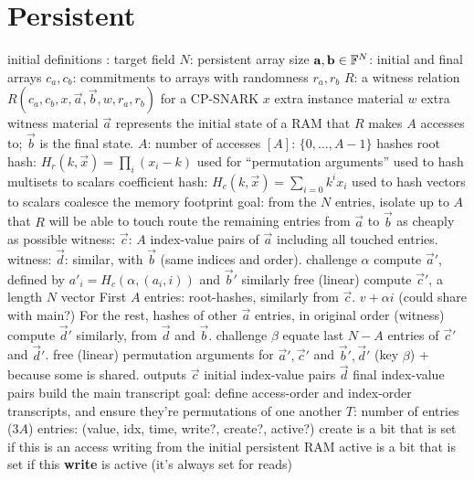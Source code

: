 \section{Persistent}
\begin{outline}
\1 initial definitions
  \2 \FF: target field
  \2 $N$: persistent array size
  \2 $\vec a, \vec b \in \FF^N$: initial and final arrays
  \2 $c_a, c_b$: commitments to arrays with randomness $r_a, r_b$
  \2 $R$: a witness relation $R(c_a, c_b, x, \vec a, \vec b, w, r_a, r_b)$ for a CP-SNARK
    \3 $x$ extra instance material
    \3 $w$ extra witness material
    \3 $\vec a$ represents the initial state of a RAM that $R$ makes $A$
    accesses to; $\vec b$ is the final state.
    \2 $A$: number of accesses
  \2 $[A]$: $\{0, \dots, A-1\}$
  \2 hashes
    \3 root hash: $H_r(k, \vec x) = \prod_i (x_i - k)$
      \4 used for ``permutation arguments''
      \4 used to hash multisets to scalars
    \3 coefficient hash: $H_c(k, \vec x) = \sum_{i=0} k^ix_i$
      \4 used to hash vectors to scalars
\1 coalesce the memory footprint
  \2 goal: from the $N$ entries, isolate up to $A$ that $R$ will be able to
  touch
    \3 route the remaining entries from $\vec a$ to $\vec b$ as cheaply as
       possible
  \2 witness: $\vec c$: $A$ index-value pairs of $\vec a$ including all touched entries.
  \2 witness: $\vec d$: similar, with $\vec b$ (same indices and order).
  \2 challenge $\alpha$
  \2 compute $\vec a'$, defined by $a'_i = H_c(\alpha, (a_i, i))$ and $\vec b'$ similarly
    \3 free (linear)
  \2 compute $\vec c'$, a length $N$ vector
    \3 First $A$ entries: root-hashes, similarly from $\vec c$.
      \4 $v + \alpha i$
      \4  (could share with main?)
    \3 For the rest, hashes of other $\vec a$ entries, in original order (witness)
  \2 compute $\vec d'$ similarly, from $\vec d$ and $\vec b$.
    \3 
  \2 challenge $\beta$
  \2 equate last $N-A$ entries of $\vec c'$ and $\vec d'$.
    \3 free (linear)
  \2 permutation arguments for $\vec a', \vec c'$ and $\vec b', \vec d'$ (key $\beta$)
    \3  + 
    \3 because some is shared.
  \2 outputs
    \3 $\vec c$ initial index-value pairs
    \3 $\vec d$ final index-value pairs
\1 build the main transcript
  \2 goal: define access-order and index-order transcripts, and ensure they're
  permutations of one another
  \2 $T$: number of entries ($3A$)
  \2 entries: (value, idx, time, write?, create?, active?)
    \3 create is a bit that is set if this is an access writing from the initial persistent RAM
    \3 active is a bit that is set if this \textbf{write} is active (it's always set for reads)

\end{outline}
